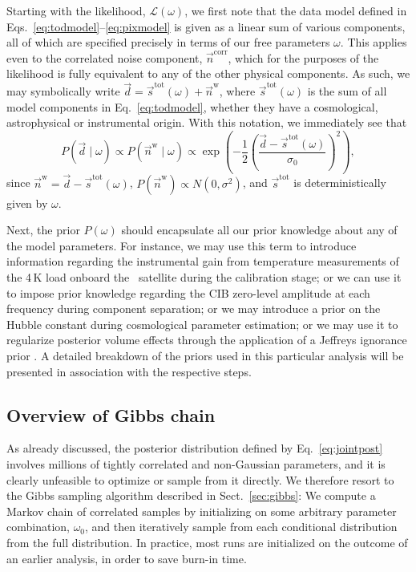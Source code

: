\documentclass[onecolumn]{aa}
\renewcommand{\d}[0]{\vec{d}}
\newcommand{\n}[0]{\vec{n}}
\newcommand{\s}[0]{\vec{s}}
\begin{document}
Starting with the likelihood, $\mathcal{L}(\omega)$, we first note
that the data model defined in
Eqs.~\eqref{eq:todmodel}--\eqref{eq:pixmodel} is given as a linear sum of
various components, all of which are specified precisely in terms of
our free parameters $\omega$. This applies even to the correlated
noise component, $\n^{\mathrm{corr}}$, which for the purposes of the
likelihood is fully equivalent to any of the other physical
components. As such, we may symbolically write $\d =
\s^{\mathrm{tot}}(\omega) + \n^{\mathrm{w}}$, where
$\s^{\mathrm{tot}}(\omega)$ is the sum of all model components in
Eq.~\eqref{eq:todmodel}, whether they have a cosmological, astrophysical
or instrumental origin. With this notation, we immediately see that
\begin{equation}
P(\d\mid \omega) \propto P(\n^{\mathrm{w}}\mid \omega) \propto \exp\left({-\frac{1}{2}\left(\frac{\d-\s^{\mathrm{tot}}(\omega)}{\sigma_0}\right)^2}\right),
\end{equation}
since $\n^{\mathrm{w}} = \d - \s^{\mathrm{tot}}(\omega)$, 
$P(\n^{\mathrm{w}}) \propto N(0,\sigma^2)$, and $\s^{\mathrm{tot}}$ is
deterministically given by $\omega$.

Next, the prior $P(\omega)$ should encapsulate all our prior knowledge
about any of the model parameters. For instance, we may use this term
to introduce information regarding the instrumental gain from
temperature measurements of the 4\,K load onboard the
\Planck\ satellite during the calibration stage; or we can use it to
impose prior knowledge regarding the CIB zero-level amplitude at each
frequency during component separation; or we may introduce a prior on
the Hubble constant during cosmological parameter estimation; or we
may use it to regularize posterior volume effects through the
application of a Jeffreys ignorance prior \citep{jeffreys:1946}. A
detailed breakdown of the priors used in this particular analysis will
be presented in association with the respective steps.

\subsection{Overview of Gibbs chain}
\label{sec:gibbschain}

As already discussed, the posterior distribution defined by
Eq.~\ref{eq:jointpost} involves millions of tightly correlated and
non-Gaussian parameters, and it is clearly unfeasible to optimize or
sample from it directly. We therefore resort to the Gibbs sampling
algorithm described in Sect.~\ref{sec:gibbs}: We compute a Markov
chain of correlated samples by initializing on some arbitrary
parameter combination, $\omega_0$, and then iteratively sample from
each conditional distribution from the full distribution. In
practice, most runs are initialized on the outcome of an earlier
analysis, in order to save burn-in time.
\end{document}
